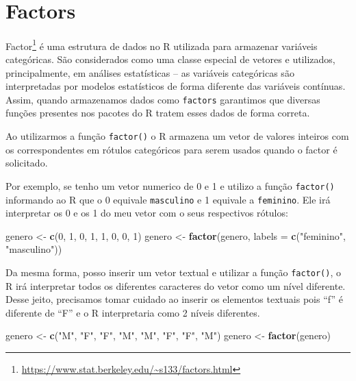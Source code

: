 \documentclass[]{book}
\newenvironment{Shaded}{\begin{snugshade}}{\end{snugshade}}
\newcommand{\DataTypeTok}[1]{\textcolor[rgb]{0.13,0.29,0.53}{#1}}
\newcommand{\DecValTok}[1]{\textcolor[rgb]{0.00,0.00,0.81}{#1}}
\newcommand{\KeywordTok}[1]{\textcolor[rgb]{0.13,0.29,0.53}{\textbf{#1}}}
\newcommand{\NormalTok}[1]{#1}
\newcommand{\StringTok}[1]{\textcolor[rgb]{0.31,0.60,0.02}{#1}}
\let\rmarkdownfootnote\footnote%
\def\footnote{\protect\rmarkdownfootnote}
\theoremstyle{definition}
\theoremstyle{definition}
\theoremstyle{definition}
\theoremstyle{remark}
\begin{document}
~

\hypertarget{factors}{%
\section{Factors}\label{factors}}

Factor\footnote{\url{https://www.stat.berkeley.edu/~s133/factors.html}} é uma estrutura de dados no R utilizada para armazenar variáveis categóricas. São considerados como uma classe especial de vetores e utilizados, principalmente, em análises estatísticas -- as variáveis categóricas são interpretadas por modelos estatísticos de forma diferente das variáveis contínuas. Assim, quando armazenamos dados como \texttt{factors} garantimos que diversas funções presentes nos pacotes do R tratem esses dados de forma correta.

Ao utilizarmos a função \texttt{factor()} o R armazena um vetor de valores inteiros com os correspondentes em rótulos categóricos para serem usados quando o factor é solicitado.

Por exemplo, se tenho um vetor numerico de 0 e 1 e utilizo a função \texttt{factor()} informando ao R que o 0 equivale \texttt{masculino} e 1 equivale a \texttt{feminino}. Ele irá interpretar os 0 e os 1 do meu vetor com o seus respectivos rótulos:

\begin{Shaded}
\begin{Highlighting}[]
\NormalTok{genero <-}\StringTok{ }\KeywordTok{c}\NormalTok{(}\DecValTok{0}\NormalTok{, }\DecValTok{1}\NormalTok{, }\DecValTok{0}\NormalTok{, }\DecValTok{1}\NormalTok{, }\DecValTok{1}\NormalTok{, }\DecValTok{0}\NormalTok{, }\DecValTok{0}\NormalTok{, }\DecValTok{1}\NormalTok{)}
\NormalTok{genero <-}\StringTok{ }\KeywordTok{factor}\NormalTok{(genero, }\DataTypeTok{labels =} \KeywordTok{c}\NormalTok{(}\StringTok{"feminino"}\NormalTok{, }\StringTok{"masculino"}\NormalTok{))}
\end{Highlighting}
\end{Shaded}

Da mesma forma, posso inserir um vetor textual e utilizar a função \texttt{factor()}, o R irá interpretar todos os diferentes caracteres do vetor como um nível diferente. Desse jeito, precisamos tomar cuidado ao inserir os elementos textuais pois ``f'' é diferente de ``F'' e o R interpretaria como 2 níveis diferentes.

\begin{Shaded}
\begin{Highlighting}[]
\NormalTok{genero <-}\StringTok{ }\KeywordTok{c}\NormalTok{(}\StringTok{"M"}\NormalTok{, }\StringTok{"F"}\NormalTok{, }\StringTok{"F"}\NormalTok{, }\StringTok{"M"}\NormalTok{, }\StringTok{"M"}\NormalTok{, }\StringTok{"F"}\NormalTok{, }\StringTok{"F"}\NormalTok{, }\StringTok{"M"}\NormalTok{)}
\NormalTok{genero <-}\StringTok{ }\KeywordTok{factor}\NormalTok{(genero)}
\end{Highlighting}
\end{Shaded}
\end{document}

